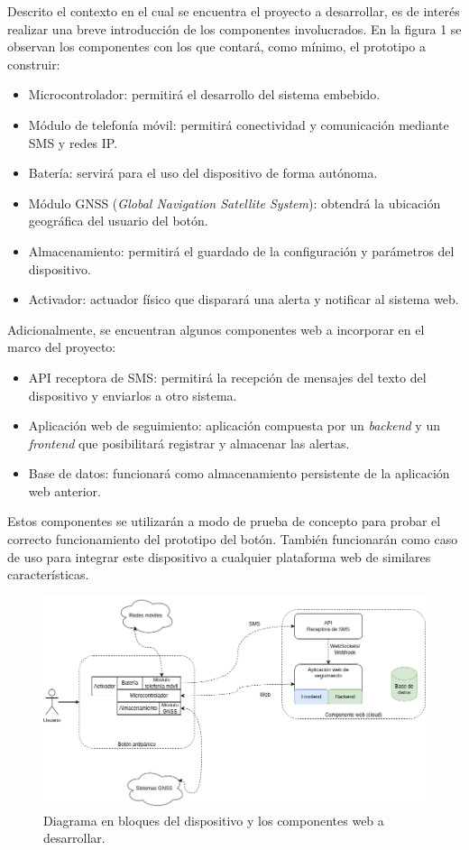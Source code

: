 \documentclass[
11pt, %
]{charter}
\begin{document}
Descrito el contexto en el cual se encuentra el proyecto a desarrollar, es de interés realizar una breve introducción de los componentes involucrados. En la figura 1 se observan los componentes con los que contará, como mínimo, el prototipo a construir:
\begin{itemize}
	\item Microcontrolador: permitirá el desarrollo del sistema embebido.
	\item Módulo de telefonía móvil: permitirá conectividad y comunicación mediante SMS y redes IP.
	\item Batería: servirá para el uso del dispositivo de forma autónoma.
	\item Módulo GNSS (\textit{Global Navigation Satellite System}): obtendrá la ubicación geográfica del usuario del botón.
	\item Almacenamiento: permitirá el guardado de la configuración y parámetros del dispositivo.
	\item Activador: actuador físico que disparará una alerta y notificar al sistema web.
\end{itemize}

Adicionalmente, se encuentran algunos componentes web a incorporar en el marco del proyecto:

\begin{itemize}
	\item API receptora de SMS: permitirá la recepción de mensajes del texto del dispositivo y enviarlos a otro sistema.
	\item Aplicación web de seguimiento: aplicación compuesta por un \textit{backend} y un \textit{frontend} que posibilitará registrar y almacenar las alertas.
	\item Base de datos: funcionará como almacenamiento persistente de la aplicación web anterior.
\end{itemize}

Estos componentes se utilizarán a modo de prueba de concepto para probar el correcto funcionamiento del prototipo del botón. También funcionarán como caso de uso para integrar este dispositivo a cualquier plataforma web de similares características.

\begin{figure}[htpb]
\centering 
\includegraphics[width=1\textwidth]{./Figuras/diagBloques.png}
\caption{Diagrama en bloques del dispositivo y los componentes web a desarrollar.}
\label{fig:diagBloques}
\end{figure}
\end{document}
